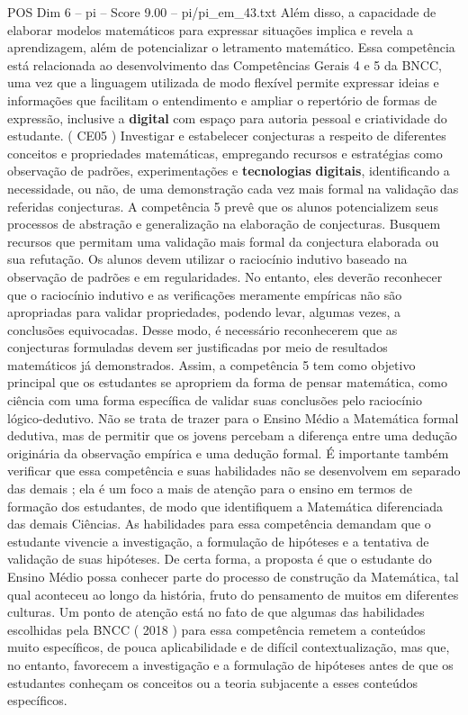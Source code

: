 \begin{textsample}{POS Dim 6 – pi – Score 9.00 – pi/pi\_em\_43.txt}
Além disso, a capacidade de elaborar modelos matemáticos para expressar situações implica e revela a aprendizagem, além de potencializar o letramento matemático.
Essa competência está relacionada ao desenvolvimento das Competências Gerais 4 e 5 da BNCC, uma vez que a linguagem utilizada de modo flexível permite expressar ideias e informações que facilitam o entendimento e ampliar o repertório de formas de expressão, inclusive a \textbf{digital} com espaço para autoria pessoal e criatividade do estudante. ( CE05 ) Investigar e estabelecer conjecturas a respeito de diferentes conceitos e propriedades matemáticas, empregando recursos e estratégias como observação de padrões, experimentações e \textbf{tecnologias} \textbf{digitais}, identificando a necessidade, ou não, de uma demonstração cada vez mais formal na validação das referidas conjecturas.
A competência 5 prevê que os alunos potencializem seus processos de abstração e generalização na elaboração de conjecturas.
Busquem recursos que permitam uma validação mais formal da conjectura elaborada ou sua refutação.
Os alunos devem utilizar o raciocínio indutivo baseado na observação de padrões e em regularidades.
No entanto, eles deverão reconhecer que o raciocínio indutivo e as verificações meramente empíricas não são apropriadas para validar propriedades, podendo levar, algumas vezes, a conclusões equivocadas.
Desse modo, é necessário reconhecerem que as conjecturas formuladas devem ser justificadas por meio de resultados matemáticos já demonstrados.
Assim, a competência 5 tem como objetivo principal que os estudantes se apropriem da forma de pensar matemática, como ciência com uma forma específica de validar suas conclusões pelo raciocínio lógico-dedutivo.
Não se trata de trazer para o Ensino Médio a Matemática formal dedutiva, mas de permitir que os jovens percebam a diferença entre uma dedução originária da observação empírica e uma dedução formal.
É importante também verificar que essa competência e suas habilidades não se desenvolvem em separado das demais ; ela é um foco a mais de atenção para o ensino em termos de formação dos estudantes, de modo que identifiquem a Matemática diferenciada das demais Ciências.
As habilidades para essa competência demandam que o estudante vivencie a investigação, a formulação de hipóteses e a tentativa de validação de suas hipóteses.
De certa forma, a proposta é que o estudante do Ensino Médio possa conhecer parte do processo de construção da Matemática, tal qual aconteceu ao longo da história, fruto do pensamento de muitos em diferentes culturas.
Um ponto de atenção está no fato de que algumas das habilidades escolhidas pela BNCC ( 2018 ) para essa competência remetem a conteúdos muito específicos, de pouca aplicabilidade e de difícil contextualização, mas que, no entanto, favorecem a investigação e a formulação de hipóteses antes de que os estudantes conheçam os conceitos ou a teoria subjacente a esses conteúdos específicos.

\end{textsample}
